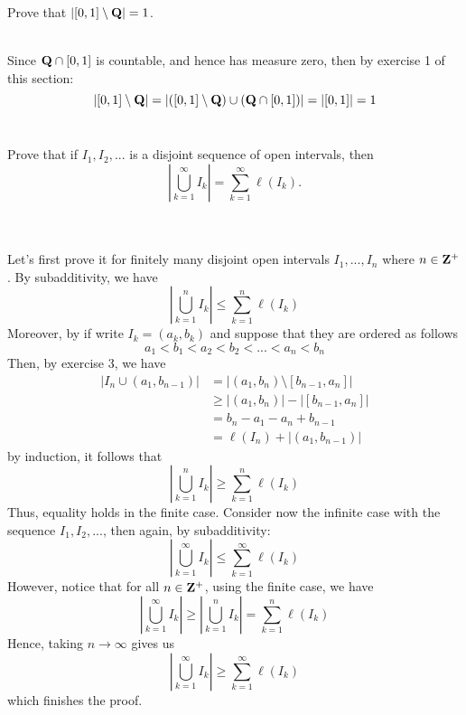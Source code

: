 \begin{exercise}
    Prove that $|[0,1]\setminus \mathbf{Q}| = 1$. \\
\end{exercise}

\begin{solution}
    \\Since $\mathbf{Q} \cap [0,1]$ is countable, and hence has measure zero, then by exercise 1 of this section:
    $$|[0,1]\setminus \mathbf{Q}| = |([0,1]\setminus \mathbf{Q}) \cup (\mathbf{Q} \cap [0,1])| = |[0,1]| = 1$$\\
\end{solution}

\begin{exercise}
    Prove that if $I_1, I_2, ...$ is a disjoint sequence of open intervals, then
    $$\left| \bigcup_{k=1}^{\infty}I_k \right| = \sum_{k=1}^{\infty}\ell(I_k).$$\\
\end{exercise}

\begin{solution}
    \\ Let's first prove it for finitely many disjoint open intervals $I_1, ..., I_n$ where $n \in \mathbf{Z}^+$. By subadditivity, we have
    $$\left| \bigcup_{k=1}^n I_k \right| \leq \sum_{k=1}^n \ell(I_k)$$
    Moreover, by if write $I_k = (a_k, b_k)$ and suppose that they are ordered as follows
    $$a_1 < b_1 < a_2 < b_2 < ... < a_n < b_n$$
    Then, by exercise 3, we have
    \begin{align*}
        |I_n \cup (a_1, b_{n-1})| &= |(a_1, b_n) \setminus [b_{n-1}, a_n]| \\
        &\geq |(a_1, b_n)| - |[b_{n-1}, a_n]| \\
        &= b_n - a_1 - a_n + b_{n-1} \\
        &= \ell(I_n) + |(a_1, b_{n-1})|
    \end{align*}
    by induction, it follows that
    $$\left| \bigcup_{k=1}^n I_k \right| \geq \sum_{k=1}^{n}\ell(I_k)$$
    Thus, equality holds in the finite case. Consider now the infinite case with the sequence $I_1, I_2, ...$, then again, by subadditivity:
    $$\left| \bigcup_{k=1}^{\infty} I_k \right| \leq \sum_{k=1}^{\infty} \ell(I_k)$$
    However, notice that for all $n \in \mathbf{Z}^+$, using the finite case, we have
    $$\left| \bigcup_{k=1}^{\infty} I_k \right| \geq \left| \bigcup_{k=1}^{n} I_k \right| = \sum_{k=1}^{n} \ell(I_k)$$
    Hence, taking $n \rightarrow \infty$ gives us
    $$\left| \bigcup_{k=1}^{\infty} I_k \right| \geq \sum_{k=1}^{\infty} \ell(I_k)$$
    which finishes the proof. \\
\end{solution}

